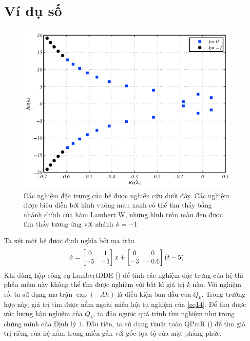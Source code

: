 \section{Ví dụ số}
\begin{figure}[h!]
	\centering
	\includegraphics[scale= 0.7]{"./Hinh/Hinh 2"}
	\caption[Các nghiệm đặc trưng của hệ được nghiên cứu dưới đây. Các nghiệm được biểu diễn bởi hình vuông màu xanh có thể tìm thấy bằng nhánh chính của hàm Lambert W, những hình tròn màu đen được tìm thấy tương ứng với nhánh $k = -1$ ] {Các nghiệm đặc trưng của hệ được nghiên cứu dưới đây. Các nghiệm được biểu diễn bởi hình vuông màu xanh có thể tìm thấy bằng nhánh chính của hàm Lambert W, những hình tròn màu đen được tìm thấy tương ứng với nhánh $k = -1$}
	\label{fig:hinh-2}
\end{figure}
%
\noindent Ta xét một hệ được định nghĩa bởi ma trận
\begin{equation}\label{eq33}
	\dot{x} = \begin{bmatrix} 0 & 1\\ -5 &-1 \end{bmatrix}x + \begin{bmatrix} 	0 & 0\\ -3 &-0.6 \end{bmatrix}(t - 5)
\end{equation}
Khi dùng hộp công cụ LambertDDE (\cite{YiJune12}) để tính các nghiệm đặc trưng của hệ thì phần mềm này không thể tìm được nghiệm với bất kì giá trị $k$ nào. Với nghiệm số, ta sử dụng ma trận $\exp (-Ah )$ là điều kiện ban đầu của $Q_k$. Trong trường hợp này, giá trị tìm được nằm ngoài miền hội tụ nghiệm của \eqref{eq14}.
Để thu được ước lượng hậu nghiệm của $Q_k$, ta đảo ngược quá trình tìm nghiệm như trong chứng minh của Định lý $1$. 
Đầu tiên, ta sử dụng thuật toán QPmR (\cite{Vyh09}) để tìm giá trị riêng của hệ nằm trong miền gần với gốc tọa tộ của mặt phẳng phức. 

